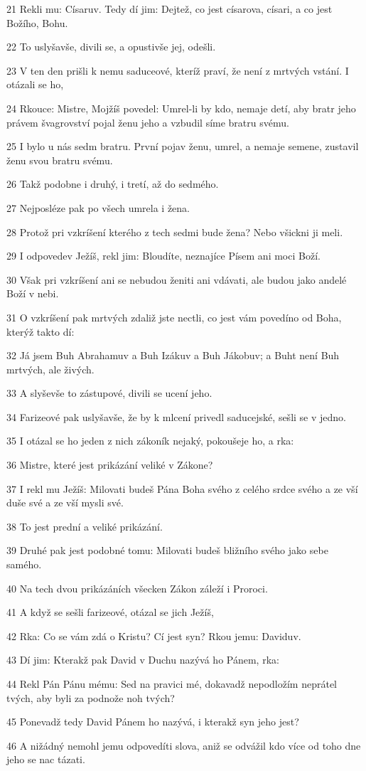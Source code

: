\par 21 Rekli mu: Císaruv. Tedy dí jim: Dejtež, co jest císarova, císari, a co jest Božího, Bohu.
\par 22 To uslyšavše, divili se, a opustivše jej, odešli.
\par 23 V ten den prišli k nemu saduceové, kteríž praví, že není z mrtvých vstání. I otázali se ho,
\par 24 Rkouce: Mistre, Mojžíš povedel: Umrel-li by kdo, nemaje detí, aby bratr jeho právem švagrovství pojal ženu jeho a vzbudil síme bratru svému.
\par 25 I bylo u nás sedm bratru. První pojav ženu, umrel, a nemaje semene, zustavil ženu svou bratru svému.
\par 26 Takž podobne i druhý, i tretí, až do sedmého.
\par 27 Nejposléze pak po všech umrela i žena.
\par 28 Protož pri vzkríšení kterého z tech sedmi bude žena? Nebo všickni ji meli.
\par 29 I odpovedev Ježíš, rekl jim: Bloudíte, neznajíce Písem ani moci Boží.
\par 30 Však pri vzkríšení ani se nebudou ženiti ani vdávati, ale budou jako andelé Boží v nebi.
\par 31 O vzkríšení pak mrtvých zdaliž jste nectli, co jest vám povedíno od Boha, kterýž takto dí:
\par 32 Já jsem Buh Abrahamuv a Buh Izákuv a Buh Jákobuv; a Buht není Buh mrtvých, ale živých.
\par 33 A slyševše to zástupové, divili se ucení jeho.
\par 34 Farizeové pak uslyšavše, že by k mlcení privedl saducejské, sešli se v jedno.
\par 35 I otázal se ho jeden z nich zákoník nejaký, pokoušeje ho, a rka:
\par 36 Mistre, které jest prikázání veliké v Zákone?
\par 37 I rekl mu Ježíš: Milovati budeš Pána Boha svého z celého srdce svého a ze vší duše své a ze vší mysli své.
\par 38 To jest prední a veliké prikázání.
\par 39 Druhé pak jest podobné tomu: Milovati budeš bližního svého jako sebe samého.
\par 40 Na tech dvou prikázáních všecken Zákon záleží i Proroci.
\par 41 A když se sešli farizeové, otázal se jich Ježíš,
\par 42 Rka: Co se vám zdá o Kristu? Cí jest syn? Rkou jemu: Daviduv.
\par 43 Dí jim: Kterakž pak David v Duchu nazývá ho Pánem, rka:
\par 44 Rekl Pán Pánu mému: Sed na pravici mé, dokavadž nepodložím neprátel tvých, aby byli za podnože noh tvých?
\par 45 Ponevadž tedy David Pánem ho nazývá, i kterakž syn jeho jest?
\par 46 A nižádný nemohl jemu odpovedíti slova, aniž se odvážil kdo více od toho dne jeho se nac tázati.

